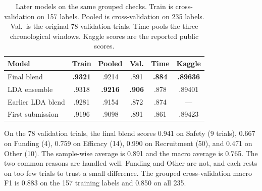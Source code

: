 \begin{table}[t]
\centering\small
\setlength{\tabcolsep}{3pt}
\begin{tabular*}{\columnwidth}{@{\extracolsep{\fill}}lccccc@{}}
\toprule
Model & Train & Pooled & Val. & Time & Kaggle \\
\midrule
Final blend & \textbf{.9321} & .9214 & .891 & \textbf{.884} & \textbf{.89636} \\
LDA ensemble & .9318 & \textbf{.9216} & \textbf{.906} & .878 & .89401 \\
Earlier LDA blend & .9281 & .9154 & .872 & .874 & --- \\
First submission & .9196 & .9098 & .891 & .861 & .89423 \\
\bottomrule
\end{tabular*}
\caption{Later models on the same grouped checks. Train is cross-validation on
157 labels. Pooled is cross-validation on 235 labels. Val.\ is the original 78
validation trials. Time pools the three chronological windows. Kaggle scores
are the reported public scores.}
\label{tab:p1final}
\end{table}

On the 78 validation trials, the final blend scores 0.941 on Safety (9
trials), 0.667 on Funding (4), 0.759 on Efficacy (14), 0.990 on Recruitment
(50), and 0.471 on Other (10). The sample-wise average is 0.891 and the
macro average is 0.765. The two common reasons are handled well. Funding and
Other are not, and each rests on too few trials to trust a small difference.
The grouped cross-validation macro F1 is 0.883 on the 157 training labels and
0.850 on all 235.
